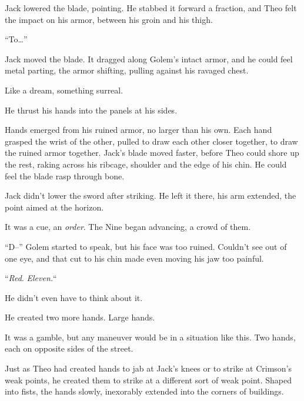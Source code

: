 Jack lowered the blade, pointing.  He stabbed it forward a fraction, and Theo felt the impact on his armor, between his groin and his thigh.



``To\ldots''



Jack moved the blade.  It dragged along Golem's intact armor, and he could feel metal parting, the armor shifting, pulling against his ravaged chest.



Like a dream, something surreal.



He thrust his hands into the panels at his sides.



Hands emerged from his ruined armor, no larger than his own.  Each hand grasped the wrist of the other, pulled to draw each other closer together, to draw the ruined armor together.  Jack's blade moved faster, before Theo could shore up the rest, raking across his ribcage, shoulder and the edge of his chin.  He could feel the blade rasp through bone.



Jack didn't lower the sword after striking.  He left it there, his arm extended, the point aimed at the horizon.



It was a cue, an \emph{order}.  The Nine began advancing, a crowd of them.



``D--'' Golem started to speak, but his face was too ruined.  Couldn't see out of one eye, and that cut to his chin made even moving his jaw too painful.



``\emph{Red}.  \emph{Eleven.}``



He didn't even have to think about it.



He created two more hands.  Large hands.



It was a gamble, but any maneuver would be in a situation like this.  Two hands, each on opposite sides of the street.



Just as Theo had created hands to jab at Jack's knees or to strike at Crimson's weak points, he created them to strike at a different sort of weak point.  Shaped into fists, the hands slowly, inexorably extended into the corners of buildings.



